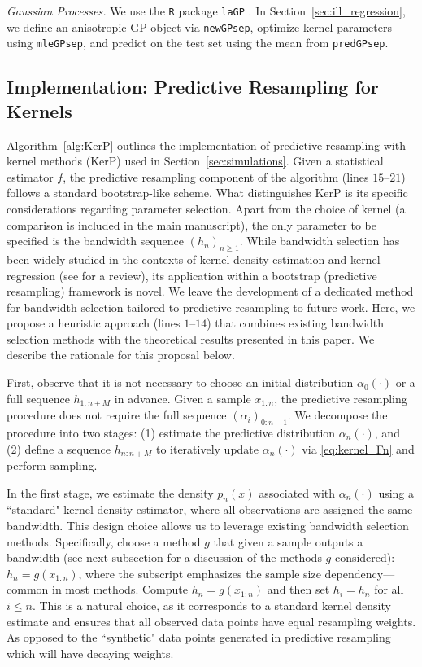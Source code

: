 \documentclass{article}
\theoremstyle{definition}
\renewcommand{\&}{and}
\begin{document}
\noindent \textit{Gaussian Processes.} We use the \texttt{R} package \texttt{laGP} \citep{gramacy2016lagp}. In Section~\ref{sec:ill_regression}, we define an anisotropic GP object via \texttt{newGPsep}, optimize kernel parameters using \texttt{mleGPsep}, and predict on the test set using the mean from \texttt{predGPsep}.




\subsection{Implementation: Predictive Resampling for Kernels }\label{sec:implementation_details}
Algorithm~\ref{alg:KerP} outlines the implementation of predictive resampling with kernel methods (KerP) used in Section~\ref{sec:simulations}. Given a statistical estimator $f$, the predictive resampling component of the algorithm (lines $15$–$21$) follows a standard bootstrap-like scheme. What distinguishes KerP is its specific considerations regarding parameter selection. Apart from the choice of kernel (a comparison is included in the main manuscript), the only parameter to be specified is the bandwidth sequence $(h_n)_{n \geq 1}$. While bandwidth selection has been widely studied in the contexts of kernel density estimation and kernel regression (see \cite{jones1996brief} for a review), its application within a bootstrap (predictive resampling) framework is novel. We leave the development of a dedicated method for bandwidth selection tailored to predictive resampling to future work. Here, we propose a heuristic approach  (lines $1$–$14$) that combines existing bandwidth selection methods with the theoretical results presented in this paper. We describe the rationale for this proposal below.

First, observe that it is not necessary to choose an initial distribution $\alpha_0(\cdot)$ or a full sequence $h_{1:n+M}$ in advance. Given a sample $x_{1:n}$, the predictive resampling procedure does not require the full sequence $(\alpha_i)_{0:n-1}$. We decompose the procedure into two stages: (1) estimate the predictive distribution $\alpha_n(\cdot)$, and (2) define a sequence $h_{n:n+M}$ to iteratively update $\alpha_n(\cdot)$ via \eqref{eq:kernel_Fn} and perform sampling.

In the first stage, we estimate the density $p_n(x)$ associated with $\alpha_n(\cdot)$ using a ``standard" kernel density estimator, where all observations are assigned the same bandwidth. This design choice allows us to leverage existing bandwidth selection methods. Specifically, choose a method $g$ that given a sample outputs a bandwidth (see next subsection for a discussion of the methods $g$ considered): $h_n = g(x_{1:n})$, where the subscript emphasizes the sample size dependency—common in most methods. Compute $h_n=g(x_{1:n})$ and then set $h_i = h_n$ for all $i \leq n$. This is a natural choice, as it corresponds to a standard kernel density estimate and ensures that all observed data points have equal resampling weights. As opposed to the ``synthetic" data points generated in predictive resampling which will have decaying weights. %
\end{document}
